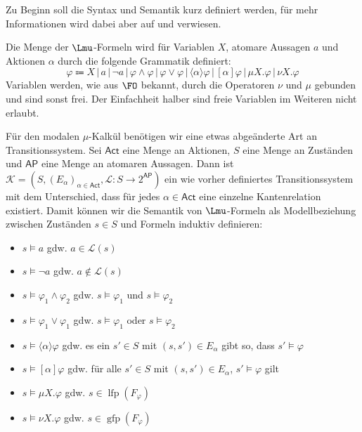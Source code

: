 Zu Beginn soll die Syntax und Semantik kurz definiert werden, für mehr Informationen wird dabei aber auf \cite{stirling1991local} und \cite{kozen1983results} verwiesen.
\begin{definition}
	Die Menge der $\Lmu$-Formeln wird für Variablen $X$, atomare Aussagen $a$ und Aktionen $\alpha$ durch die folgende Grammatik definiert:
	$$
	\varphi \Coloneqq X \,|\, a \,|\, \neg a \,|\, \varphi \land \varphi \,|\, \varphi \lor \varphi \,|\, \langle \alpha\rangle \varphi \,|\, [\alpha]\varphi \,|\, \mu X.\varphi \,|\, \nu X.\varphi
	$$
	Variablen werden, wie aus $\FO$ bekannt, durch die Operatoren $\nu$ und $\mu$ gebunden und sind sonst frei.
	Der Einfachheit halber sind freie Variablen im Weiteren nicht erlaubt.
	
	Für den modalen $\mu$-Kalkül benötigen wir eine etwas abgeänderte Art an Transitionssystem.
	Sei $\mathsf{Act}$ eine Menge an Aktionen, $S$ eine Menge an Zuständen und $\mathsf{AP}$ eine Menge an atomaren Aussagen.
	Dann ist $\mathcal{K}=(S,(E_\alpha)_{\alpha\in \mathsf{Act}}, \mathcal{L}:S\to 2^{\mathsf{AP}})$ ein wie vorher definiertes Transitionssystem mit dem Unterschied, dass für jedes $\alpha\in \mathsf{Act}$ eine einzelne Kantenrelation existiert.
	Damit können wir die Semantik von $\Lmu$-Formeln als Modellbeziehung zwischen Zuständen $s\in S$ und Formeln induktiv definieren:
	\begin{itemize}
		\item $s\models a$ gdw. $a\in \mathcal{L}(s)$
		\item $s\models \neg a$ gdw. $a\notin \mathcal{L}(s)$
		\item $s\models \varphi_1\land\varphi_2$ gdw. $s\models \varphi_1$ und $s\models \varphi_2$
		\item $s\models \varphi_1\lor\varphi_1$ gdw. $s\models \varphi_1$ oder $s\models \varphi_2$
		\item $s\models \langle \alpha \rangle\varphi$ gdw. es ein $s'\in S$ mit $(s,s')\in E_\alpha$ gibt so, dass $s'\models \varphi$
		\item $s\models [\alpha]\varphi$ gdw. für alle $s'\in S$ mit $(s,s')\in E_\alpha$, $s'\models \varphi$ gilt
		\item $s\models \mu X.\varphi$ gdw. $s\in \operatorname{lfp}(F_\varphi)$
		\item $s\models \nu X.\varphi$ gdw. $s\in \operatorname{gfp}(F_\varphi)$
	\end{itemize}
\end{definition}

